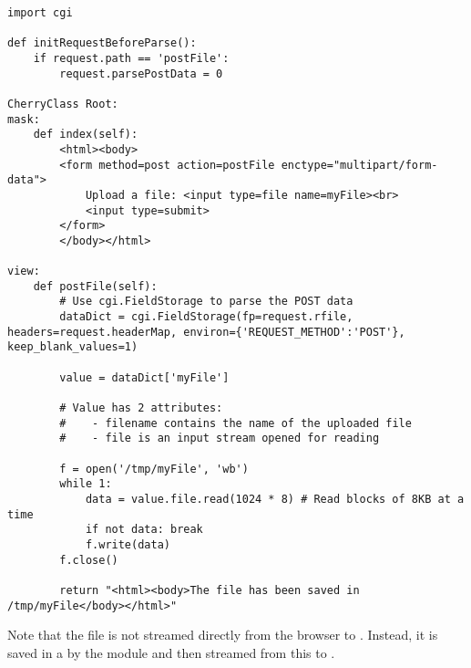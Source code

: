 \documentclass{manual}
\begin{document}
\begin{verbatim}
import cgi

def initRequestBeforeParse():
    if request.path == 'postFile':
        request.parsePostData = 0

CherryClass Root:
mask:
    def index(self):
        <html><body>
        <form method=post action=postFile enctype="multipart/form-data">
            Upload a file: <input type=file name=myFile><br>
            <input type=submit>
        </form>
        </body></html>

view:
    def postFile(self):
        # Use cgi.FieldStorage to parse the POST data
        dataDict = cgi.FieldStorage(fp=request.rfile, headers=request.headerMap, environ={'REQUEST_METHOD':'POST'}, keep_blank_values=1)

        value = dataDict['myFile']

        # Value has 2 attributes:
        #    - filename contains the name of the uploaded file
        #    - file is an input stream opened for reading

        f = open('/tmp/myFile', 'wb')
        while 1:
            data = value.file.read(1024 * 8) # Read blocks of 8KB at a time
            if not data: break
            f.write(data)
        f.close()

        return "<html><body>The file has been saved in /tmp/myFile</body></html>"
\end{verbatim}

Note that the file is not streamed directly from the browser to . Instead, it is saved in a 
by the  module and then streamed from this  to .
\end{document}

